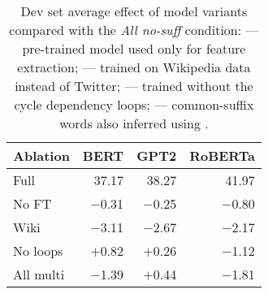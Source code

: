 \begin{table}
    \centering
    \small
    \begin{tabular}{lrrr}
        \toprule
        Ablation & BERT & GPT2 & RoBERTa \\
        \midrule
        Full & 37.17 & 38.27 & 41.97 \\
        No FT & $-$0.31 & $-$0.25 & $-$0.80 \\
        Wiki \ppt{} & $-$3.11 & $-$2.67 & $-$2.17 \\
        No loops & $+$0.82 & $+$0.26 & $-$1.12 \\
        All multi & $-$1.39 & $+$0.44 & $-$1.81 \\	
        \bottomrule
    \end{tabular}
    \caption{Dev set average effect of model variants compared with the \textit{All no-suff} condition: %
     --- pre-trained model used only for feature extraction;
     --- \tokdetok{} trained on Wikipedia data instead of Twitter;
     --- trained without the cycle dependency loops;
     --- common-suffix words also inferred using \tok{}.}
    \label{tab:ablations}
\end{table}



